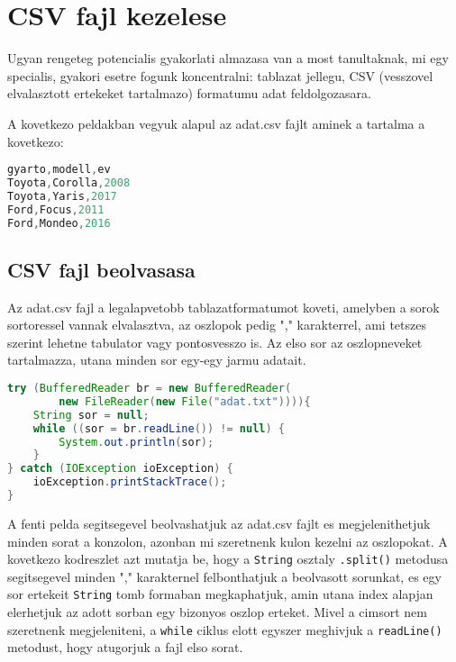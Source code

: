 \documentclass{article}
\let\l\lstinline
\begin{document}
\newpage

\section{CSV fajl kezelese}

Ugyan rengeteg potencialis gyakorlati almazasa van a most tanultaknak, mi egy specialis, gyakori esetre fogunk koncentralni: tablazat jellegu, CSV (vesszovel elvalasztott ertekeket tartalmazo) formatumu adat feldolgozasara.

A kovetkezo peldakban vegyuk alapul az adat.csv fajlt aminek a tartalma a kovetkezo:

\begin{lstlisting}[language=Java, caption=Adat.csv]
gyarto,modell,ev
Toyota,Corolla,2008
Toyota,Yaris,2017
Ford,Focus,2011
Ford,Mondeo,2016
\end{lstlisting}

\subsection{CSV fajl beolvasasa}

Az adat.csv fajl a legalapvetobb tablazatformatumot koveti, amelyben a sorok sortoressel vannak elvalasztva, az oszlopok pedig "," karakterrel, ami tetszes szerint lehetne tabulator vagy pontosvesszo is. Az elso sor az oszlopneveket tartalmazza, utana minden sor egy-egy jarmu adatait.

\begin{lstlisting}[language=Java, caption=BufferedReader hasznalata]
try (BufferedReader br = new BufferedReader(
        new FileReader(new File("adat.txt")))){
    String sor = null;
    while ((sor = br.readLine()) != null) {
        System.out.println(sor);
    }
} catch (IOException ioException) {
    ioException.printStackTrace();
}
\end{lstlisting}

A fenti pelda segitsegevel beolvashatjuk az adat.csv fajlt es megjelenithetjuk minden sorat a konzolon, azonban mi szeretnenk kulon kezelni az oszlopokat. A kovetkezo kodreszlet azt mutatja be, hogy a \l{String} osztaly \l{.split()} metodusa segitsegevel minden "," karakternel felbonthatjuk a beolvasott sorunkat, es egy sor ertekeit \l{String} tomb formaban megkaphatjuk, amin utana index alapjan elerhetjuk az adott sorban egy bizonyos oszlop erteket. Mivel a cimsort nem szeretnenk megjeleniteni, a \l{while} ciklus elott egyszer meghivjuk a \l{readLine()} metodust, hogy atugorjuk a fajl elso sorat.
\end{document}
